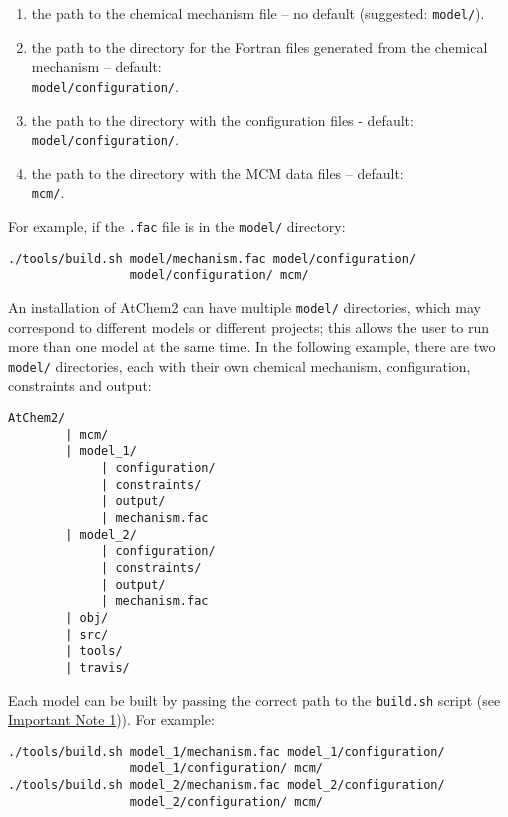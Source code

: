 \begin{enumerate}
\item the path to the chemical mechanism file -- no default
  (suggested: \texttt{model/}).
\item the path to the directory for the Fortran files generated from
  the chemical mechanism -- default:\\ \texttt{model/configuration/}.
\item the path to the directory with the configuration files -
  default:\\ \texttt{model/configuration/}.
\item the path to the directory with the MCM data files -- default:\\
  \texttt{mcm/}.
\end{enumerate}

For example, if the \texttt{.fac} file is in the \texttt{model/}
directory:

\begin{verbatim}
./tools/build.sh model/mechanism.fac model/configuration/
                 model/configuration/ mcm/
\end{verbatim}

An installation of AtChem2 can have multiple \texttt{model/}
directories, which may correspond to different models or different
projects; this allows the user to run more than one model at the same
time. In the following example, there are two \texttt{model/}
directories, each with their own chemical mechanism, configuration,
constraints and output:

\newpage
\begin{verbatim}
AtChem2/
        | mcm/
        | model_1/
             | configuration/
             | constraints/
             | output/
             | mechanism.fac
        | model_2/
             | configuration/
             | constraints/
             | output/
             | mechanism.fac
        | obj/
        | src/
        | tools/
        | travis/
\end{verbatim}

Each model can be built by passing the correct path to the
\texttt{build.sh} script (see \hyperref[important-note-1]{Important
  Note 1})). For example:

\begin{verbatim}
./tools/build.sh model_1/mechanism.fac model_1/configuration/
                 model_1/configuration/ mcm/
./tools/build.sh model_2/mechanism.fac model_2/configuration/
                 model_2/configuration/ mcm/
\end{verbatim}

